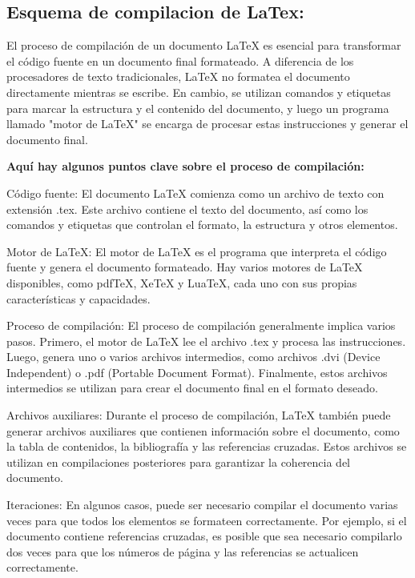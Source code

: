\documentclass[10pt,twocolumn]{article}
\begin{document}
    \subsection{Esquema de compilacion de LaTex:}
    El proceso de compilación de un documento LaTeX es esencial para transformar el código fuente en un documento final formateado. 
    A diferencia de los procesadores de texto tradicionales, LaTeX no formatea el documento directamente mientras se escribe. 
    En cambio, se utilizan comandos y etiquetas para marcar la estructura y el contenido del documento, y luego un programa llamado "motor de LaTeX" se encarga de procesar estas instrucciones y generar el documento final.
    
{\raggedleft \textbf{Aquí hay algunos puntos clave sobre el proceso de compilación:}}

    Código fuente: El documento LaTeX comienza como un archivo de texto con extensión .tex. Este archivo contiene el texto del documento, así como los comandos y etiquetas que controlan el formato, la estructura y otros elementos.

    Motor de LaTeX: El motor de LaTeX es el programa que interpreta el código fuente y genera el documento formateado. Hay varios motores de LaTeX disponibles, como pdfTeX, XeTeX y LuaTeX, cada uno con sus propias características y capacidades.

    Proceso de compilación: El proceso de compilación generalmente implica varios pasos. Primero, el motor de LaTeX lee el archivo .tex y procesa las instrucciones. Luego, genera uno o varios archivos intermedios, como archivos .dvi (Device Independent) o .pdf (Portable Document Format). Finalmente, estos archivos intermedios se utilizan para crear el documento final en el formato deseado.

    Archivos auxiliares: Durante el proceso de compilación, LaTeX también puede generar archivos auxiliares que contienen información sobre el documento, como la tabla de contenidos, la bibliografía y las referencias cruzadas. Estos archivos se utilizan en compilaciones posteriores para garantizar la coherencia del documento.

    Iteraciones: En algunos casos, puede ser necesario compilar el documento varias veces para que todos los elementos se formateen correctamente. Por ejemplo, si el documento contiene referencias cruzadas, es posible que sea necesario compilarlo dos veces para que los números de página y las referencias se actualicen correctamente.
\end{document}

